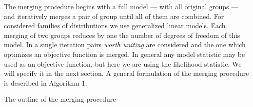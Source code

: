 \documentclass[12pt]{article}
\begin{document}
The merging procedure begins with a full model --- with all original groups --- and iteratively merges a pair of group until all of them are combined. 
For considered families of distributions we use generalized linear models. Each merging of two groups reduces by one the number of degrees of freedom of this model. In a single iteration pairs \emph{worth uniting} are considered and the one which optimizes an objective function is merged. 
In general any model statistic may be used as an objective function, but here we are using the likelihood statistic. We will specify it in the next section. A general formulation of the merging procedure is described in Algorithm 1.


\begin{algorithm}[H]
\caption{\label{algorithm1}The outline of the merging procedure}
\label{outline}
\begin{algorithmic}[2]

 \EndWhile
    \EndFunction
\end{algorithmic}
\end{algorithm}
\end{document}
